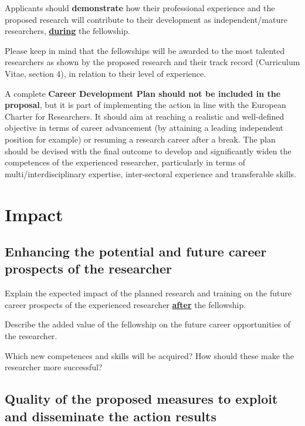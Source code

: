 Applicants should \textbf{demonstrate} how their professional experience and the proposed
research will contribute to their development as independent/mature researchers, \ul{\textbf{during}}
the fellowship.

\medskip\noindent
Please keep in mind that the fellowships will be awarded to the most talented researchers
as shown by the proposed research and their track record (Curriculum Vitae, section 4),
in relation to their level of experience.

\medskip\noindent
A complete {\bf Career Development Plan should not be included in the proposal}, 
but it is part of implementing the action in line with the European Charter for Researchers. It
should aim at reaching a realistic and well-defined objective in terms of career
advancement (by attaining a leading independent position for example) or resuming a
research career after a break. The plan should be devised with the final outcome to
develop and significantly widen the competences of the experienced researcher,
particularly in terms of multi/interdisciplinary expertise, inter-sectoral experience and
transferable skills.




\newpage
\section{Impact}
\label{sec:impact}

\subsection{Enhancing the potential and future career prospects of the researcher}
\label{sec:impact_researcher}

Explain the expected impact of the planned research and training on the future career prospects of the experienced researcher \ul{\textbf{after}} the fellowship.

\medskip\noindent
Describe the added value of the fellowship on the future career opportunities of the
researcher.

\medskip\noindent
Which new competences and skills will be acquired? How should these make the
researcher more successful?




\subsection{Quality of the proposed measures to exploit and disseminate the action results}
\label{sec:impact_dissemination}

